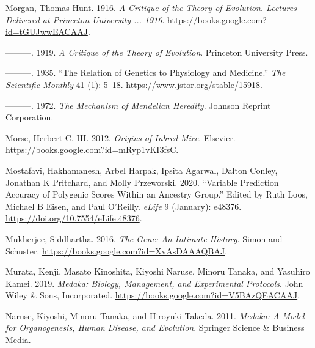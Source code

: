 \documentclass[
]{book}
\newlength{\cslhangindent}
\newlength{\cslentryspacingunit} %
\newenvironment{CSLReferences}[2] %
 {%
  \setlength{\parindent}{0pt}
  \ifodd #1
  \let\oldpar\par
  \def\par{\hangindent=\cslhangindent\oldpar}
  \fi
  \setlength{\parskip}{#2\cslentryspacingunit}
 }%
 {}
\begin{document}
\begin{CSLReferences}{1}{0}
\leavevmode{}%
Morgan, Thomas Hunt. 1916. \emph{A {Critique} of the {Theory} of {Evolution}. {Lectures Delivered} at {Princeton University} ... 1916}. \url{https://books.google.com?id=tGUJwwEACAAJ}.

\leavevmode{}%
---------. 1919. \emph{A {Critique} of the {Theory} of {Evolution}}. {Princeton University Press}.

\leavevmode{}%
---------. 1935. {``The {Relation} of {Genetics} to {Physiology} and {Medicine}.''} \emph{The Scientific Monthly} 41 (1): 5--18. \url{https://www.jstor.org/stable/15918}.

\leavevmode{}%
---------. 1972. \emph{The {Mechanism} of {Mendelian Heredity}}. {Johnson Reprint Corporation}.

\leavevmode{}%
Morse, Herbert C. III. 2012. \emph{Origins of {Inbred Mice}}. {Elsevier}. \url{https://books.google.com?id=mRyp1vKI3fsC}.

\leavevmode{}%
Mostafavi, Hakhamanesh, Arbel Harpak, Ipsita Agarwal, Dalton Conley, Jonathan K Pritchard, and Molly Przeworski. 2020. {``Variable Prediction Accuracy of Polygenic Scores Within an Ancestry Group.''} Edited by Ruth Loos, Michael B Eisen, and Paul O'Reilly. \emph{eLife} 9 (January): e48376. \url{https://doi.org/10.7554/eLife.48376}.

\leavevmode{}%
Mukherjee, Siddhartha. 2016. \emph{The {Gene}: {An Intimate History}}. {Simon and Schuster}. \url{https://books.google.com?id=XvAsDAAAQBAJ}.

\leavevmode{}%
Murata, Kenji, Masato Kinoshita, Kiyoshi Naruse, Minoru Tanaka, and Yasuhiro Kamei. 2019. \emph{Medaka: {Biology}, {Management}, and {Experimental Protocols}}. {John Wiley \& Sons, Incorporated}. \url{https://books.google.com?id=V5BAzQEACAAJ}.

\leavevmode{}%
Naruse, Kiyoshi, Minoru Tanaka, and Hiroyuki Takeda. 2011. \emph{Medaka: A Model for Organogenesis, Human Disease, and Evolution}. {Springer Science \& Business Media}.


\end{CSLReferences}
\end{document}
